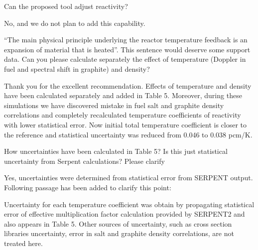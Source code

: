 \documentclass[answers,11pt]{exam}
\begin{document}
\begin{questions}

        \question Can the proposed tool adjust reactivity?
        \begin{solution}
                No, and we do not plan to add this capability.
        \end{solution}


        \question ``The main physical principle underlying the reactor 
        temperature feedback is an expansion of material that is heated''. This 
        sentence would deserve some support data. Can you please calculate 
        separately the effect of temperature (Doppler in fuel and spectral 
        shift in graphite) and density?
        \begin{solution}
                Thank you for the excellent recommendation. Effects of temperature
                 and density have been calculated separately and added in Table 5.
                 Moreover, during these simulations we have discovered mistake in 
                 fuel salt and graphite density correlations and completely 
                 recalculated temperature coefficients of reactivity with lower 
                 statistical error. Now initial total temperature coefficient is 
                 closer to the reference and statistical uncertainty was reduced 
                 from 0.046 to 0.038 pcm/K.
        \end{solution}


        \question How uncertainties have been calculated in Table 5? Is this 
        just statistical uncertainty from Serpent calculations? Please clarify
        \begin{solution}
                Yes, uncertainties were determined from statistical error 
                from SERPENT output. Following passage has been added to clarify
                 this point:
                 
                 Uncertainty for each temperature coefficient was obtain by 
                 propagating statistical error of effective multiplication factor 
                 calculation provided by SERPENT2 and also appears in Table 5. 
                 Other sources of uncertainty, such as cross section libraries 
				 uncertainty, error in salt and graphite density correlations, 
				 are not treated here.
        \end{solution}


\end{questions}
\end{document}
